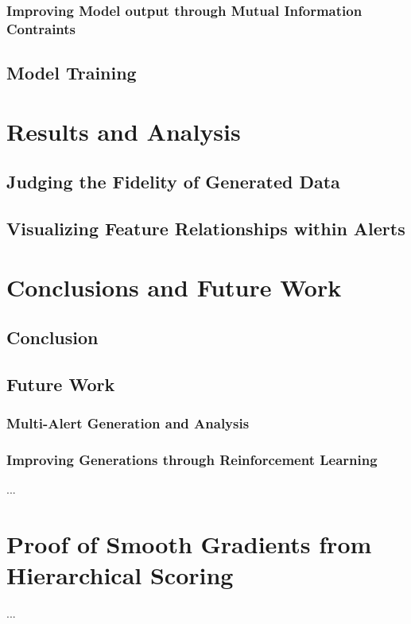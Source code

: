 \documentclass[12pt,american]{report}
\begin{document}
\subsection{Improving Model output through Mutual Information Contraints}

\section{Model Training}

\chapter{Results and Analysis}

\section{Judging the Fidelity of Generated Data}

\section{Visualizing Feature Relationships within Alerts}

\chapter{Conclusions and Future Work}

\section{Conclusion}

\section{Future Work}

\subsection{Multi-Alert Generation and Analysis}

\subsection{Improving Generations through Reinforcement Learning}

  ...
  \nocite{*}


\begin{singlespace}

\end{singlespace}

\appendix
\chapter{Proof of Smooth Gradients from Hierarchical Scoring}
  ...
\end{document}
